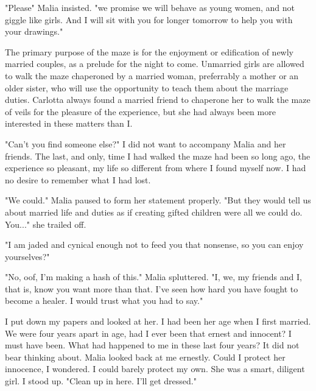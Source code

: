 \documentclass{article}
\begin{document}
"Please" Malia insisted. "we promise we will behave as young women, and not giggle like girls. And I will sit with you for longer tomorrow to help you with your drawings."  

The primary purpose of the maze is for the enjoyment or edification of newly married couples, as a prelude for the night to come. Unmarried girls are allowed to walk the maze chaperoned by a married woman, preferrably a mother or an older sister, who will use the opportunity to teach them about the marriage duties. Carlotta always found a married friend to chaperone her to walk the maze of veils for the pleasure of the experience, but she had always been more interested in these matters than I. 

"Can't you find someone else?" I did not want to accompany Malia and her friends. The last, and only, time I had walked the maze had been so long ago, the experience so pleasant, my life so different from where I found myself now. I had no desire to remember what I had lost. 

"We could." Malia paused to form her statement properly. "But they would tell us about married life and duties as if creating gifted children were all we could do. You..." she trailed off.

"I am jaded and cynical enough not to feed you that nonsense, so you can enjoy yourselves?"

"No, oof, I'm making a hash of this." Malia spluttered. "I, we, my friends and I, that is, know you want more than that. I've seen how hard you have fought to become a healer. I would trust what you had to say."

I put down my papers and looked at her. I had been her age when I first married. We were four years apart in age, had I ever been that ernest and innocent? I must have been. What had happened to me in these last four years? It did not bear thinking about. Malia looked back at me ernestly. Could I protect her innocence, I wondered. I could barely protect my own. She was a smart, diligent girl. I stood up. "Clean up in here. I'll get dressed."
\end{document}
